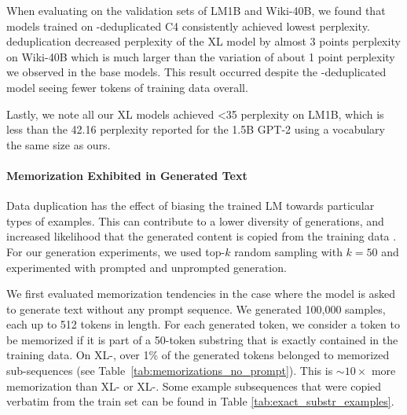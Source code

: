When evaluating on the validation sets of LM1B and Wiki-40B, we found that models trained on \Approx-deduplicated C4 consistently achieved lowest perplexity.
\Exact{} deduplication decreased perplexity of the XL model by almost 3 points perplexity on Wiki-40B which is much larger than the variation of about 1 point perplexity we observed in the base models.
This result occurred despite the \Exact-deduplicated model seeing fewer tokens of training data overall.

Lastly, we note all our XL models achieved  <35 perplexity on LM1B, which is less than the 42.16 perplexity reported for the 1.5B GPT-2 using a vocabulary the same size as ours.


\paragraph{Memorization Exhibited in Generated Text}
\label{sec:memorization-results}
Data duplication has the effect of biasing the trained LM towards particular types of examples. 
This can contribute to a lower diversity of generations, and increased likelihood that the generated content is copied from the training data \citep{carlini2020extracting}.
For our generation experiments, we used top-$k$ random sampling with $k=50$ and experimented with prompted and unprompted generation.


We first evaluated memorization tendencies in the case where the model is asked to generate text without any prompt sequence.
We generated 100,000 samples, each up to 512 tokens in length.
For each generated token, we consider a token to be memorized if it is part of a 50-token substring that is exactly contained in the training data.
On XL-\Original, over 1\% of the generated tokens belonged to memorized sub-sequences (see Table~\ref{tab:memorizations_no_prompt}).
This is $\sim10\times$ more memorization than XL-\Exact{} or XL-\Approx.
Some example subsequences that were copied verbatim from the train set can be found in Table \ref{tab:exact_substr_examples}.





